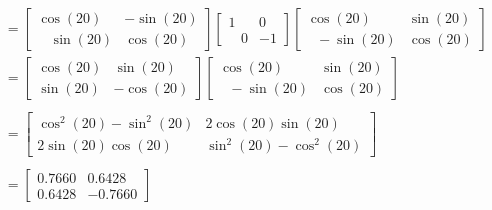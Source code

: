 \documentclass[a4paper,11pt]{article}
\begin{document}
\begin{preview}
\begin{enumerate}
        \begin{align*}
            &=\begin{bmatrix}\cos\left(20\right)&-\sin\left(20\right)\\ \:\:\:\:\sin\left(20\right)&\cos\left(20\right)\end{bmatrix}\begin{bmatrix}1&0\\ \:\:\:\:0&-1\end{bmatrix}\begin{bmatrix}\cos\left(20\right)&\sin\left(20\right)\\ \:\:\:-\sin\left(20\right)&\cos\left(20\right)\end{bmatrix}\\
            &=\begin{bmatrix}\cos \left(20\right)&\sin \left(20\right)\\ \sin \left(20\right)&-\cos \left(20\right)\end{bmatrix}\begin{bmatrix}\cos\left(20\right)&\sin\left(20\right)\\ \:\:\:-\sin\left(20\right)&\cos\left(20\right)\end{bmatrix}\\\\
            &=\begin{bmatrix}\cos ^2\left(20\right)-\sin ^2\left(20\right)&2\cos \left(20\right)\sin \left(20\right)\\ 2\sin \left(20\right)\cos \left(20\right)&\sin ^2\left(20\right)-\cos ^2\left(20\right)\end{bmatrix}\\\\
            &=\begin{bmatrix}
                0.7660 & 0.6428\\
                0.6428 & -0.7660
            \end{bmatrix}
        \end{align*}

    \end{enumerate}

\end{preview}
\end{document}
